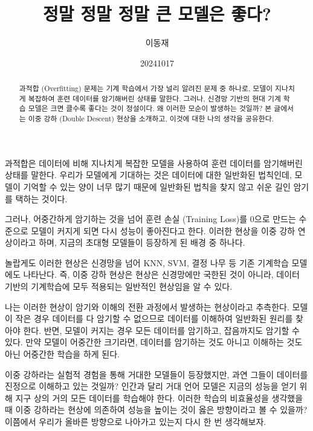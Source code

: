 \documentclass[11pt, oneside]{article}   	%
\title{정말 정말 정말 큰 모델은 좋다?}
\author{이동재}
\date{20241017}
\begin{document}
\maketitle


\begin{abstract}
  과적합 (Overfitting) 문제는 기계 학습에서 가장 널리 알려진 문제 중 하나로, 모델이 지나치게 복잡하여 훈련 데이터를  암기해버린 상태를 말한다. 그러나, 신경망 기반의 현대 기계 학습 모델은 크면 클수록 좋다는 것이 정설이다. 왜 이러한 모순이 발생하는 것일까? 본 글에서는 이중 강하 (Double Descent) 현상을 소개하고, 이것에 대한 나의 생각을 공유한다.
\end{abstract}
과적합은 데이터에 비해 지나치게 복잡한 모델을 사용하여 훈련 데이터를 암기해버린 상태를 말한다. 우리가 모델에게 기대하는 것은 데이터에 대한 일반화된 법칙인데, 모델이 기억할 수 있는 양이 너무 많기 때문에 일반화된 법칙을 찾지 않고 쉬운 길인 암기를 택하는 것이다.

그러나, 어중간하게 암기하는 것을 넘어 훈련 손실 (Training Loss)를 0으로 만드는 수준으로 모델이 커지게 되면 다시 성능이 좋아진다고 한다. 이러한 현상을 이중 강하 연상이라고 하며, 지금의 초대형 모델들이 등장하게 된 배경 중 하나다.

놀랍게도 이러한 현상은 신경망을 넘어 KNN, SVM, 결정 나무 등 기존 기계학습 모델에도 나타난다. 즉, 이중 강하 현상은 현상은 신경망에만 국한된 것이 아니라, 데이터 기반의 기계학습에 모두 적용되는 일반적인 현상임을 알 수 있다.

나는 이러한 현상이 암기와 이해의 전환 과정에서 발생하는 현상이라고 추측한다. 모델이 작은 경우 데이터를 다 암기할 수 없으므로 데이터를 이해하여 일반화된 원리를 찾아야 한다. 반면, 모델이 커지는 경우 모든 데이터를 암기하고, 잡음까지도 암기할 수 있다. 만약 모델이 어중간한 크기라면, 데이터를 암기하는 것도 아니고 이해하는 것도 아닌 어중간한 학습을 하게 된다.

이중 강하라는 실험적 경험을 통해 거대한 모델들이 등장했지만, 과연 그들이 데이터를 진정으로 이해하고 있는 것일까? 인간과 달리 거대 언어 모델은 지금의 성능을 얻기 위해 지구 상의 거의 모든 데이터를 학습해야 한다. 이러한 학습의 비효율성을 생각했을 때 이중 강하라는 현상에 의존하여 성능을 높이는 것이 옳은 방향이라고 볼 수 있을까? 이쯤에서 우리가 올바른 방향으로 나아가고 있는지 다시 한 번 생각해보자.
\end{document}
